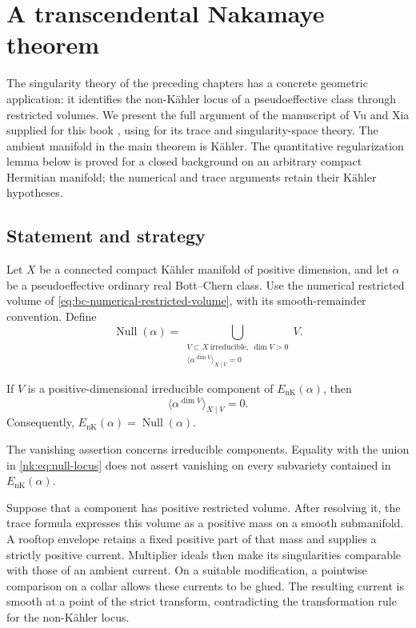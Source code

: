 \chapter{A transcendental Nakamaye theorem}
\label{chap:transcendental-nakamaye}
\providecommand{\NkRes}[1]{\operatorname{Res}_{#1}}

The singularity theory of the preceding chapters has a concrete geometric
application: it identifies the non-K\"ahler locus of a pseudoeffective
class through restricted volumes. We present the full argument of the
manuscript of Vu and Xia supplied for this book \cite{VXNull}, using
\cite{SGPT} for its trace and singularity-space theory. The ambient
manifold in the main theorem is K\"ahler. The quantitative regularization
lemma below is proved for a closed background on an arbitrary compact
Hermitian manifold; the numerical and trace arguments retain their
K\"ahler hypotheses.

\section{Statement and strategy}

Let $X$ be a connected compact K\"ahler manifold of positive dimension,
and let $\alpha$ be a pseudoeffective ordinary real Bott--Chern class.
Use the numerical restricted volume of
\cref{eq:bc-numerical-restricted-volume}, with its smooth-remainder
convention. Define
\begin{equation}\label{nk:eq:null-locus}
 \operatorname{Null}(\alpha)
 =\bigcup_{\substack{V\subset X\ \mathrm{irreducible},\ \dim V>0\\
          \langle\alpha^{\dim V}\rangle_{X\mid V}=0}}V.
\end{equation}

\begin{theorem}\label{nk:thm:main}
If $V$ is a positive-dimensional irreducible component of
$E_{\mathrm{nK}}(\alpha)$, then
\[
 \langle\alpha^{\dim V}\rangle_{X\mid V}=0.
\]
Consequently,
$E_{\mathrm{nK}}(\alpha)=\operatorname{Null}(\alpha)$.
\end{theorem}

The vanishing assertion concerns irreducible components. Equality with
the union in \eqref{nk:eq:null-locus} does not assert vanishing on every
subvariety contained in $E_{\mathrm{nK}}(\alpha)$.

Suppose that a component has positive restricted volume. After resolving
it, the trace formula expresses this volume as a positive mass on a
smooth submanifold. A rooftop envelope retains a fixed positive part of
that mass and supplies a strictly positive current. Multiplier ideals
then make its singularities comparable with those of an ambient current.
On a suitable modification, a pointwise comparison on a collar allows
these currents to be glued. The resulting current is smooth at a point
of the strict transform, contradicting the transformation rule for the
non-K\"ahler locus.


